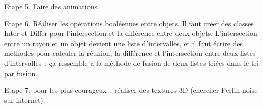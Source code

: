 \documentclass[a4paper]{article}
\begin{document}
Etape 5. Faire des animations.

Etape 6. Réaliser les opérations booléennes entre objets. Il faut créer des classes Inter et Differ pour l'intersection et la différence entre deux objets.
L'intersection entre un rayon et un objet devient une liste d'intervalles,
et il faut écrire des méthodes pour calculer la réunion, la différence et 
l'intersection entre deux listes d'intervalles~; ça ressemble à la méthode de fusion de deux listes triées dans le tri par fusion.

Etape 7, pour les plus courageux~: réaliser des textures 3D (chercher Perlin noise sur internet).
\end{document}
